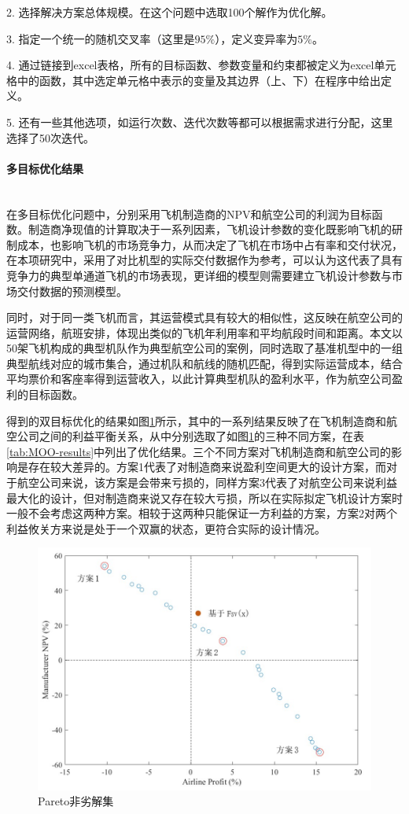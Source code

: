 \documentclass[12pt,a4paper]{report}
\begin{document}
2. 选择解决方案总体规模。在这个问题中选取100个解作为优化解。

3. 指定一个统一的随机交叉率（这里是$95\%$），定义变异率为$5\%$。

4. 通过链接到excel表格，所有的目标函数、参数变量和约束都被定义为excel单元格中的函数，其中选定单元格中表示的变量及其边界（上、下）在程序中给出定义。

5. 还有一些其他选项，如运行次数、迭代次数等都可以根据需求进行分配，这里选择了50次迭代。

\paragraph{多目标优化结果}~{}
\\

在多目标优化问题中，分别采用飞机制造商的NPV和航空公司的利润为目标函数。制造商净现值的计算取决于一系列因素，飞机设计参数的变化既影响飞机的研制成本，也影响飞机的市场竞争力，从而决定了飞机在市场中占有率和交付状况，在本项研究中，采用了对比机型的实际交付数据作为参考，可以认为这代表了具有竞争力的典型单通道飞机的市场表现，更详细的模型则需要建立飞机设计参数与市场交付数据的预测模型。

同时，对于同一类飞机而言，其运营模式具有较大的相似性，这反映在航空公司的运营网络，航班安排，体现出类似的飞机年利用率和平均航段时间和距离。本文以50架飞机构成的典型机队作为典型航空公司的案例，同时选取了基准机型中的一组典型航线对应的城市集合，通过机队和航线的随机匹配，得到实际运营成本，结合平均票价和客座率得到运营收入，以此计算典型机队的盈利水平，作为航空公司盈利的目标函数。

得到的双目标优化的结果如图\ref{fig:pareto}所示，其中的一系列结果反映了在飞机制造商和航空公司之间的利益平衡关系，从中分别选取了如图\ref{fig:pareto}的三种不同方案，在表\ref{tab:MOO-results}中列出了优化结果。三个不同方案对飞机制造商和航空公司的影响是存在较大差异的。方案1代表了对制造商来说盈利空间更大的设计方案，而对于航空公司来说，该方案是会带来亏损的，同样方案3代表了对航空公司来说利益最大化的设计，但对制造商来说又存在较大亏损，所以在实际拟定飞机设计方案时一般不会考虑这两种方案。相较于这两种只能保证一方利益的方案，方案2对两个利益攸关方来说是处于一个双赢的状态，更符合实际的设计情况。

\begin{figure}[htp]
\centering
   \includegraphics[width=.8\textwidth]{eps/pareto.jpg}
    \caption{Pareto非劣解集}
    \label{fig:pareto}
\end{figure}
\end{document}
